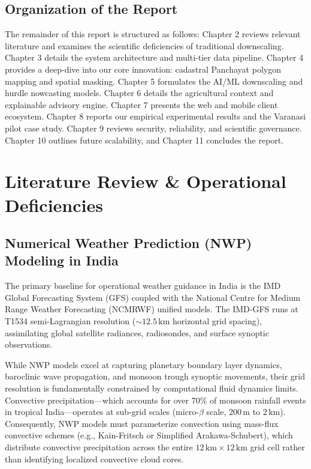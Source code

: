 \documentclass[11pt,a4paper,oneside]{report}
\begin{document}
\section{Organization of the Report}
The remainder of this report is structured as follows: Chapter 2 reviews relevant literature and examines the scientific deficiencies of traditional downscaling. Chapter 3 details the system architecture and multi-tier data pipeline. Chapter 4 provides a deep-dive into our core innovation: cadastral Panchayat polygon mapping and spatial masking. Chapter 5 formulates the AI/ML downscaling and hurdle nowcasting models. Chapter 6 details the agricultural context and explainable advisory engine. Chapter 7 presents the web and mobile client ecosystem. Chapter 8 reports our empirical experimental results and the Varanasi pilot case study. Chapter 9 reviews security, reliability, and scientific governance. Chapter 10 outlines future scalability, and Chapter 11 concludes the report.

\chapter{Literature Review \& Operational Deficiencies}

\section{Numerical Weather Prediction (NWP) Modeling in India}
The primary baseline for operational weather guidance in India is the IMD Global Forecasting System (GFS) coupled with the National Centre for Medium Range Weather Forecasting (NCMRWF) unified models. The IMD-GFS runs at T1534 semi-Lagrangian resolution ($\sim 12.5\,\text{km}$ horizontal grid spacing), assimilating global satellite radiances, radiosondes, and surface synoptic observations. 

While NWP models excel at capturing planetary boundary layer dynamics, baroclinic wave propagation, and monsoon trough synoptic movements, their grid resolution is fundamentally constrained by computational fluid dynamics limits. Convective precipitation—which accounts for over $70\%$ of monsoon rainfall events in tropical India—operates at sub-grid scales (micro-$\beta$ scale, $200\,\text{m}$ to $2\,\text{km}$). Consequently, NWP models must parameterize convection using mass-flux convective schemes (e.g., Kain-Fritsch or Simplified Arakawa-Schubert), which distribute convective precipitation across the entire $12\,\text{km} \times 12\,\text{km}$ grid cell rather than identifying localized convective cloud cores.
\end{document}
